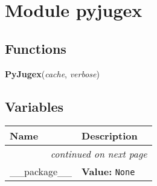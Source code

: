 %
%
%


\section{Module pyjugex}

    \label{pyjugex}


  \subsection{Functions}

    \label{pyjugex:PyJugex}

    \vspace{0.5ex}

\hspace{.8\funcindent}\begin{boxedminipage}{\funcwidth}

    \raggedright \textbf{PyJugex}(\textit{cache}, \textit{verbose})

\setlength{\parskip}{2ex}
\setlength{\parskip}{1ex}
    \end{boxedminipage}



  \subsection{Variables}

    \vspace{-1cm}
\hspace{\varindent}\begin{longtable}{|p{\varnamewidth}|p{\vardescrwidth}|l}
\cline{1-2}
\cline{1-2} \centering \textbf{Name} & \centering \textbf{Description}& \\
\cline{1-2}
\endhead\cline{1-2}\multicolumn{3}{r}{\small\textit{continued on next page}}\\\endfoot\cline{1-2}
\endlastfoot\raggedright \_\-\_\-p\-a\-c\-k\-a\-g\-e\-\_\-\_\- & \raggedright \textbf{Value:} 
{\tt None}&\\
\cline{1-2}
\end{longtable}

